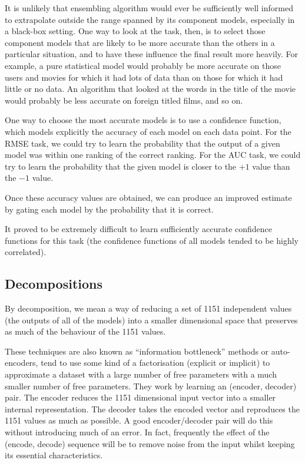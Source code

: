 \documentclass{article}
\begin{document}
It is unlikely that ensembling algorithm would ever be sufficiently well informed to extrapolate outside the range spanned by its component models, especially in a black-box setting.
One way to look at the task, then, is to select those component models that are likely to be more accurate than the others in a particular situation, and to have these influence the final result more heavily.
For example, a pure statistical model would probably be more accurate on those users and movies for which it had lots of data than on those for which it had little or no data.  An algorithm that looked at the words in the title of the movie would probably be less accurate on foreign titled films, and so on.

One way to choose the most accurate models is to use a confidence function, which models explicitly the accuracy of each model on each data point.
For the RMSE task, we could try to learn the probability that the output of a given model was within one ranking of the correct ranking.  
For the AUC task, we could try to learn the probability that the given model is closer to the $+1$ value than the $-1$ value.

Once these accuracy values are obtained, we can produce an improved estimate by gating each model by the probability that it is correct.

It proved to be extremely difficult to learn sufficiently accurate confidence functions for this task (the confidence functions of all models tended to be highly correlated).

\subsection{Decompositions}

By decomposition, we mean a way of reducing a set of 1151 independent values (the outputs of all of the models) into a smaller dimensional space that preserves as much of the behaviour of the 1151 values.

These techniques are also known as ``information bottleneck'' methods or auto-encoders, tend to use some kind of a factorisation (explicit or implicit) to approximate a dataset with a large number of free parameters with a much smaller number of free parameters.
They work by learning an (encoder, decoder) pair.  The encoder reduces the 1151 dimensional input vector into a smaller internal representation.  The decoder takes the encoded vector and reproduces the 1151 values as much as possible.  A good encoder/decoder pair will do this without introducing much of an error.  In fact, frequently the effect of the (encode, decode) sequence will be to remove noise from the input whilst keeping its essential characteristics.
\end{document}
